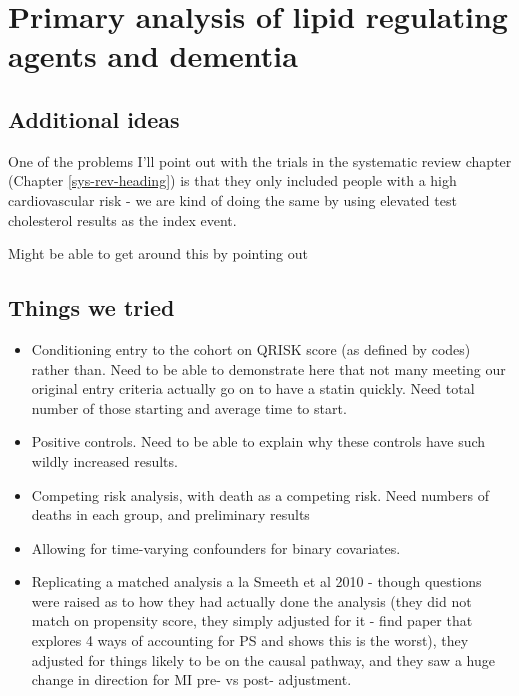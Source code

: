 \documentclass[a4paper, twoside]{templates/ociamthesis}
\providecommand{\tightlist}{%
  \setlength{\itemsep}{0pt}\setlength{\parskip}{0pt}}
\begin{document}
\hypertarget{cprd-analysis}{%
\chapter{Primary analysis of lipid regulating agents and dementia}\label{cprd-analysis}}

\minitoc 

\hypertarget{additional-ideas-1}{%
\section{Additional ideas}\label{additional-ideas-1}}

One of the problems I'll point out with the trials in the systematic review chapter (Chapter \ref{sys-rev-heading}) is that they only included people with a high cardiovascular risk - we are kind of doing the same by using elevated test cholesterol results as the index event.

Might be able to get around this by pointing out

\hypertarget{things-we-tried}{%
\section{Things we tried}\label{things-we-tried}}

\begin{itemize}
\tightlist
\item
  Conditioning entry to the cohort on QRISK score (as defined by codes) rather than. Need to be able to demonstrate here that not many meeting our original entry criteria actually go on to have a statin quickly. Need total number of those starting and average time to start.
\item
  Positive controls. Need to be able to explain why these controls have such wildly increased results.
\item
  Competing risk analysis, with death as a competing risk. Need numbers of deaths in each group, and preliminary results
\item
  Allowing for time-varying confounders for binary covariates.
\item
  Replicating a matched analysis a la Smeeth et al 2010 - though questions were raised as to how they had actually done the analysis (they did not match on propensity score, they simply adjusted for it - find paper that explores 4 ways of accounting for PS and shows this is the worst), they adjusted for things likely to be on the causal pathway, and they saw a huge change in direction for MI pre- vs post- adjustment.
\end{itemize}
\end{document}
